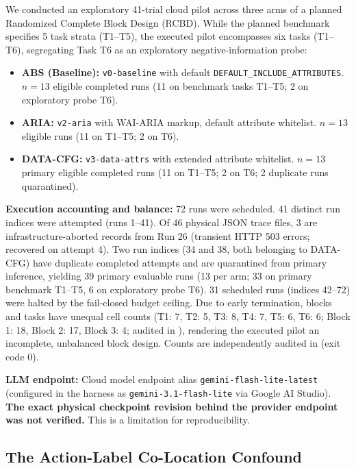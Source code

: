 \documentclass[conference]{IEEEtran}
\begin{document}
We conducted an exploratory 41-trial cloud pilot across three arms of a planned Randomized Complete Block Design (RCBD). While the planned benchmark specifies 5 task strata (T1--T5), the executed pilot encompasses six tasks (T1--T6), segregating Task T6 as an exploratory negative-information probe:
\begin{itemize}
    \item \textbf{ABS (Baseline):} \texttt{v0-baseline} with default \texttt{DEFAULT\_INCLUDE\_ATTRIBUTES}. $n=13$ eligible completed runs (11 on benchmark tasks T1--T5; 2 on exploratory probe T6).
    \item \textbf{ARIA:} \texttt{v2-aria} with WAI-ARIA markup, default attribute whitelist. $n=13$ eligible runs (11 on T1--T5; 2 on T6).
    \item \textbf{DATA-CFG:} \texttt{v3-data-attrs} with extended attribute whitelist. $n=13$ primary eligible completed runs (11 on T1--T5; 2 on T6; 2 duplicate runs quarantined).
\end{itemize}
\textbf{Execution accounting and balance:} 72 runs were scheduled. 41 distinct run indices were attempted (runs 1--41). Of 46 physical JSON trace files, 3 are infrastructure-aborted records from Run 26 (transient HTTP 503 errors; recovered on attempt 4). Two run indices (34 and 38, both belonging to DATA-CFG) have duplicate completed attempts and are quarantined from primary inference, yielding 39 primary evaluable runs (13 per arm; 33 on primary benchmark T1--T5, 6 on exploratory probe T6). 31 scheduled runs (indices 42--72) were halted by the fail-closed budget ceiling. Due to early termination, blocks and tasks have unequal cell counts (T1: 7, T2: 5, T3: 8, T4: 7, T5: 6, T6: 6; Block 1: 18, Block 2: 17, Block 3: 4; audited in ), rendering the executed pilot an incomplete, unbalanced block design. Counts are independently audited in  (exit code 0).

\textbf{LLM endpoint:} Cloud model endpoint alias \texttt{gemini-flash-lite-latest} (configured in the harness as \texttt{gemini-3.1-flash-lite} via Google AI Studio). \textbf{The exact physical checkpoint revision behind the provider endpoint was not verified.} This is a limitation for reproducibility.

\subsection{The Action-Label Co-Location Confound}
\end{document}

